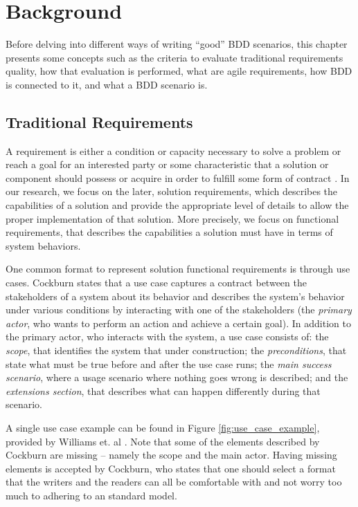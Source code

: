 \chapter{\label{chap:chap2}{Background}}

Before delving into different ways of writing ``good'' BDD scenarios, this chapter presents some concepts such as the criteria to evaluate traditional requirements quality, how that evaluation is performed, what are agile requirements, how BDD is connected to it, and what a BDD scenario is.

\section{Traditional Requirements}

A requirement is either a condition or capacity necessary to solve a problem or reach a goal for an interested party or some characteristic that a solution or component should possess or acquire in order to fulfill some form of contract \cite{Babok_2009}. In our research, we focus on the later, solution requirements, which describes the capabilities of a solution and provide the appropriate level of details to allow the proper implementation of that solution. More precisely, we focus on functional requirements, that describes the capabilities a solution must have in terms of system behaviors.

One common format to represent solution functional requirements is through use cases. Cockburn \cite{Cockburn_2000} states that a use case captures a contract between the stakeholders of a system about its behavior and describes the system’s behavior under various conditions by interacting with one of the stakeholders (the \textit{primary actor}, who wants to perform an action and achieve a certain goal). In addition to the primary actor, who interacts with the system, a use case consists of: the \textit{scope}, that identifies the system that under construction; the \textit{preconditions}, that state what must be true before and after the use case runs; the \textit{main success scenario}, where a usage scenario where nothing goes wrong is described; and the \textit{extensions section}, that describes what can happen differently during that scenario.

A single use case example can be found in Figure \ref{fig:use_case_example}, provided by Williams et. al \cite{Williams_et_dot_al_2005}. Note that some of the elements described by Cockburn \cite{Cockburn_2000} are missing -- namely the scope and the main actor. Having missing elements is accepted by Cockburn, who states that one should select a format that the writers and the readers can all be comfortable with and not worry too much to adhering to an standard model.


